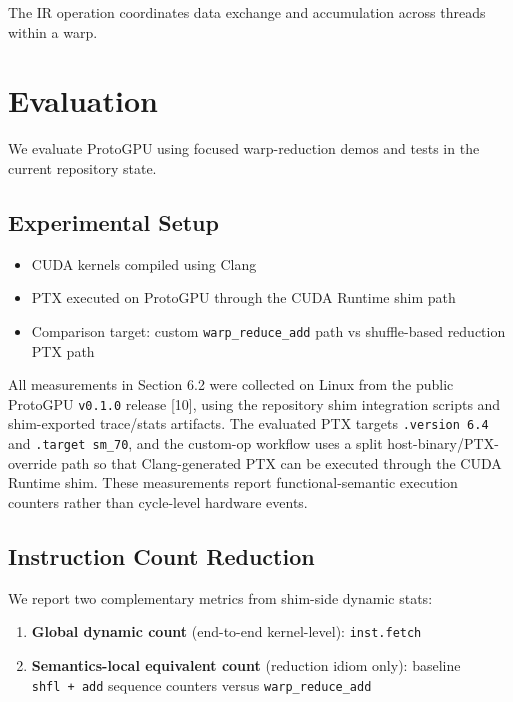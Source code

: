 \documentclass[11pt]{article}
\providecommand{\tightlist}{%
  \setlength{\itemsep}{0pt}\setlength{\parskip}{0pt}}
\begin{document}
The IR operation coordinates data exchange and accumulation across
threads within a warp.


\hypertarget{evaluation}{%
\section{Evaluation}\label{evaluation}}

We evaluate ProtoGPU using focused warp-reduction demos and tests in the
current repository state.

\hypertarget{experimental-setup}{%
\subsection{Experimental Setup}\label{experimental-setup}}

\begin{itemize}
\tightlist
\item
  CUDA kernels compiled using Clang
\item
  PTX executed on ProtoGPU through the CUDA Runtime shim path
\item
  Comparison target: custom \texttt{warp\_reduce\_add} path vs
  shuffle-based reduction PTX path
\end{itemize}

All measurements in Section 6.2 were collected on Linux from the public
ProtoGPU \texttt{v0.1.0} release [10], using the repository shim integration
scripts and shim-exported trace/stats artifacts. The evaluated PTX
targets \texttt{.version\ 6.4} and \texttt{.target\ sm\_70}, and the
custom-op workflow uses a split host-binary/PTX-override path so that
Clang-generated PTX can be executed through the CUDA Runtime shim. These
measurements report functional-semantic execution counters rather than
cycle-level hardware events.


\hypertarget{instruction-count-reduction}{%
\subsection{Instruction Count
Reduction}\label{instruction-count-reduction}}

We report two complementary metrics from shim-side dynamic stats:

\begin{enumerate}
\def\labelenumi{\arabic{enumi}.}
\tightlist
\item
  \textbf{Global dynamic count} (end-to-end kernel-level):
  \texttt{inst.fetch}
\item
  \textbf{Semantics-local equivalent count} (reduction idiom only):
  baseline \texttt{shfl\ +\ add} sequence counters versus
  \texttt{warp\_reduce\_add}
\end{enumerate}
\end{document}
